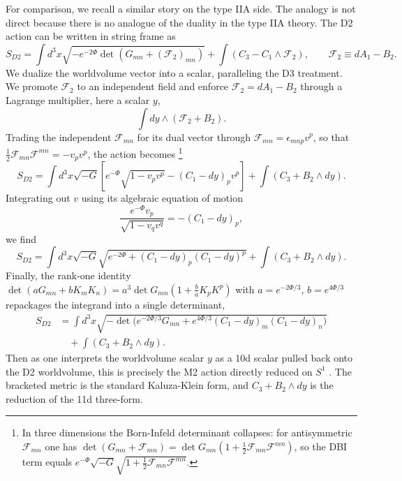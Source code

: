 For comparison, we recall a similar story on the type IIA side.
The analogy is not direct because there is no analogue of the \SLZ{} duality in the type IIA theory.
The D2 action can be written in string frame as \cite{Schmidhuber:1996fy,Tseytlin:1996it}
\begin{equation}
S_{D2}
=\int d^3x \sqrt{-e^{-2\Phi}\det (G_{mn}+(\mathcal F_2)_{mn})}
+\int\left(C_3-C_1\wedge\mathcal F_2\right),\qquad
\mathcal F_2\equiv dA_1-B_2.
\end{equation}
We dualize the worldvolume vector into a scalar, paralleling the D3 treatment.
We promote $\mathcal F_2$ to an independent field and enforce $\mathcal F_2 = dA_1-B_2$ through a Lagrange multiplier, here a scalar $y$,
\begin{equation}
\int dy\wedge(\mathcal F_2 + B_2).
\end{equation}
Trading the independent $\mathcal F_{mn}$ for its dual vector through $\mathcal F_{mn}=\epsilon_{mnp}v^p$, so that $\tfrac12\mathcal F_{mn}\mathcal F^{mn}=-v_pv^p$, the action becomes%
\footnote{In three dimensions the Born-Infeld determinant collapses: for antisymmetric $\mathcal F_{mn}$ one has $\det(G_{mn}+\mathcal F_{mn})=\det G_{mn}(1+\tfrac12\mathcal F_{mn}\mathcal F^{mn})$, so the DBI term equals $e^{-\Phi}\sqrt{-G}\sqrt{1+\tfrac12\mathcal F_{mn}\mathcal F^{mn}}$.}
\begin{equation}
S_{D2}=\int d^3x\sqrt{-G}\left[e^{-\Phi}\sqrt{1-v_pv^p}-(C_1-dy)_pv^p\right]+\int\left(C_3 + B_2\wedge dy\right).
\end{equation}
Integrating out $v$ using its algebraic equation of motion
\begin{equation}
\frac{e^{-\Phi}v_p}{\sqrt{1-v_qv^q}}=-(C_1-dy)_p,
\label{D2-integrating-out-v}
\end{equation}
we find
\begin{equation}
S_{D2}=\int d^3x\sqrt{-G}\sqrt{e^{-2\Phi}+(C_1-dy)_p(C_1-dy)^p}+\int\left(C_3 + B_2\wedge dy\right).
\end{equation}
Finally, the rank-one identity $\det(aG_{mn}+bK_mK_n)=a^3\det G_{mn}(1+\tfrac{b}{a}K_pK^p)$ with $a=e^{-2\Phi/3}$, $b=e^{4\Phi/3}$ repackages the integrand into a single determinant,
\begin{equation}
\begin{aligned}
S_{D2}
&=\int d^3x\sqrt{-\det\big(e^{-2\Phi/3}G_{mn} + e^{4\Phi/3}(C_1-dy)_m(C_1-dy)_n\big)}\\
&\quad+ \int\left(C_3 + B_2\wedge dy\right).
\end{aligned}
\end{equation}
Then as one interprets the worldvolume scalar $y$ as a 10d scalar pulled back onto the D2 worldvolume, this is precisely the M2 action directly reduced on $S^1$ \cite{Bergshoeff:1987cm,Tseytlin:1996it,Schmidhuber:1996fy}. The bracketed metric is the standard Kaluza-Klein form, and $C_3+B_2\wedge dy$ is the reduction of the 11d three-form.

